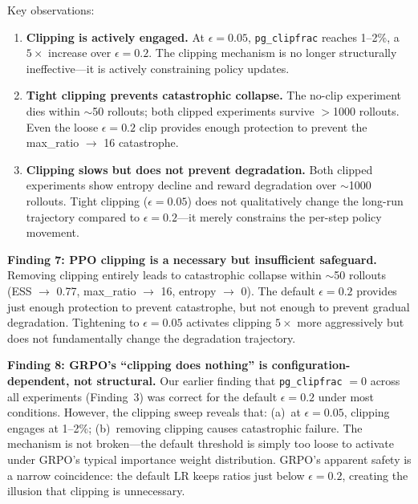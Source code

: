 \documentclass[11pt,a4paper]{article}
\begin{document}
Key observations:

\begin{enumerate}[leftmargin=*]
  \item \textbf{Clipping is actively engaged.} At $\epsilon = 0.05$,
    \texttt{pg\_clipfrac} reaches 1--2\%, a $5\times$ increase over
    $\epsilon = 0.2$. The clipping mechanism is no longer structurally
    ineffective---it is actively constraining policy updates.

  \item \textbf{Tight clipping prevents catastrophic collapse.} The no-clip
    experiment dies within $\sim$50 rollouts; both clipped experiments survive
    $>$1000 rollouts. Even the loose $\epsilon = 0.2$ clip provides enough
    protection to prevent the max\_ratio $\to$ 16 catastrophe.

  \item \textbf{Clipping slows but does not prevent degradation.} Both clipped
    experiments show entropy decline and reward degradation over $\sim$1000
    rollouts. Tight clipping ($\epsilon = 0.05$) does not qualitatively change
    the long-run trajectory compared to $\epsilon = 0.2$---it merely constrains
    the per-step policy movement.
\end{enumerate}

\begin{keyinsight}
\textbf{Finding 7: PPO clipping is a necessary but insufficient safeguard.}
Removing clipping entirely leads to catastrophic collapse within $\sim$50
rollouts (ESS $\to$ 0.77, max\_ratio $\to$ 16, entropy $\to$ 0). The default
$\epsilon = 0.2$ provides just enough protection to prevent catastrophe, but
not enough to prevent gradual degradation. Tightening to $\epsilon = 0.05$
activates clipping $5\times$ more aggressively but does not fundamentally
change the degradation trajectory.
\end{keyinsight}

\begin{keyinsight}
\textbf{Finding 8: GRPO's ``clipping does nothing'' is configuration-dependent,
not structural.} Our earlier finding that \texttt{pg\_clipfrac} $= 0$ across
all experiments (Finding~3) was correct for the default $\epsilon = 0.2$ under
most conditions. However, the clipping sweep reveals that: (a)~at
$\epsilon = 0.05$, clipping engages at 1--2\%; (b)~removing clipping causes
catastrophic failure. The mechanism is not broken---the default threshold is
simply too loose to activate under GRPO's typical importance weight
distribution. GRPO's apparent safety is a narrow coincidence: the default LR
keeps ratios just below $\epsilon = 0.2$, creating the illusion that clipping
is unnecessary.
\end{keyinsight}
\end{document}
